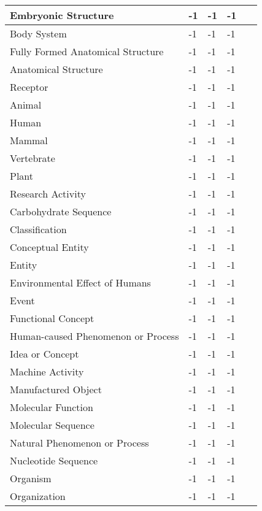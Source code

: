 \documentclass[10.7pt,]{article}
\begin{document}
\begin{longtable}{|l|p{0.3cm}|p{0.3cm}|p{0.3cm}|p{7.9cm}|}
        Embryonic Structure & -1 & -1 & -1 & ~ \\ \hline
        Body System & -1 & -1 & -1 & ~ \\ \hline
        Fully Formed Anatomical Structure & -1 & -1 & -1 & ~ \\ \hline
        Anatomical Structure & -1 & -1 & -1 & ~ \\ \hline
        Receptor & -1 & -1 & -1 & ~ \\ \hline
        Animal & -1 & -1 & -1 & ~ \\ \hline
        Human & -1 & -1 & -1 & ~ \\ \hline
        Mammal & -1 & -1 & -1 & ~ \\ \hline
        Vertebrate & -1 & -1 & -1 & ~ \\ \hline
        Plant & -1 & -1 & -1 & ~ \\ \hline
        Research Activity & -1 & -1 & -1 & ~ \\ \hline
        Carbohydrate Sequence & -1 & -1 & -1 & ~ \\ \hline
        Classification & -1 & -1 & -1 & ~ \\ \hline
        Conceptual Entity & -1 & -1 & -1 & ~ \\ \hline
        Entity & -1 & -1 & -1 & ~ \\ \hline
        Environmental Effect of Humans & -1 & -1 & -1 & ~ \\ \hline
        Event & -1 & -1 & -1 & ~ \\ \hline
        Functional Concept & -1 & -1 & -1 & ~ \\ \hline
        Human-caused Phenomenon or Process & -1 & -1 & -1 & ~ \\ \hline
        Idea or Concept & -1 & -1 & -1 & ~ \\ \hline
        Machine Activity & -1 & -1 & -1 & ~ \\ \hline
        Manufactured Object & -1 & -1 & -1 & ~ \\ \hline
        Molecular Function & -1 & -1 & -1 & ~ \\ \hline
        Molecular Sequence & -1 & -1 & -1 & ~ \\ \hline
        Natural Phenomenon or Process & -1 & -1 & -1 & ~ \\ \hline
        Nucleotide Sequence & -1 & -1 & -1 & ~ \\ \hline
        Organism & -1 & -1 & -1 & ~ \\ \hline
        Organization & -1 & -1 & -1 & ~ \\ \hline

\end{longtable}
\end{document}
